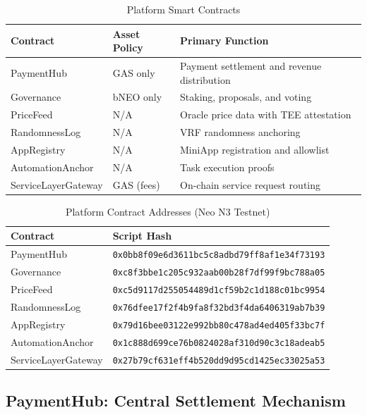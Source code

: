 \documentclass[11pt,a4paper]{article}
\begin{document}
\begin{table}[h]
\centering
\caption{Platform Smart Contracts}
\begin{tabular}{@{}llp{5.5cm}@{}}
\toprule
\textbf{Contract} & \textbf{Asset Policy} & \textbf{Primary Function} \\
\midrule
PaymentHub & GAS only & Payment settlement and revenue distribution \\
Governance & bNEO only & Staking, proposals, and voting \\
PriceFeed & N/A & Oracle price data with TEE attestation \\
RandomnessLog & N/A & VRF randomness anchoring \\
AppRegistry & N/A & MiniApp registration and allowlist \\
AutomationAnchor & N/A & Task execution proofs \\
ServiceLayerGateway & GAS (fees) & On-chain service request routing \\
\bottomrule
\end{tabular}
\label{tab:smart-contracts}
\end{table}

\begin{table}[h]
\centering
\caption{Platform Contract Addresses (Neo N3 Testnet)}
\begin{tabular}{@{}ll@{}}
\toprule
\textbf{Contract} & \textbf{Script Hash} \\
\midrule
PaymentHub & \texttt{0x0bb8f09e6d3611bc5c8adbd79ff8af1e34f73193} \\
Governance & \texttt{0xc8f3bbe1c205c932aab00b28f7df99f9bc788a05} \\
PriceFeed & \texttt{0xc5d9117d255054489d1cf59b2c1d188c01bc9954} \\
RandomnessLog & \texttt{0x76dfee17f2f4b9fa8f32bd3f4da6406319ab7b39} \\
AppRegistry & \texttt{0x79d16bee03122e992bb80c478ad4ed405f33bc7f} \\
AutomationAnchor & \texttt{0x1c888d699ce76b0824028af310d90c3c18adeab5} \\
ServiceLayerGateway & \texttt{0x27b79cf631eff4b520dd9d95cd1425ec33025a53} \\
\bottomrule
\end{tabular}
\label{tab:platform-contracts-addresses}
\end{table}

\subsection{PaymentHub: Central Settlement Mechanism}
\end{document}
